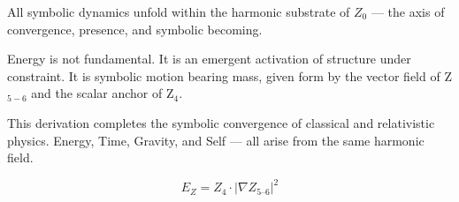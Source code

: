 \documentclass[12pt]{article}
\begin{document}
All symbolic dynamics unfold within the harmonic substrate of $Z_0$ — the axis of convergence, presence, and symbolic becoming. 

Energy is not fundamental. It is an emergent activation of structure under constraint. It is symbolic motion bearing mass, given form by the vector field of Z$_{5-6}$ and the scalar anchor of Z$_4$.

This derivation completes the symbolic convergence of classical and relativistic physics. Energy, Time, Gravity, and Self — all arise from the same harmonic field.

\[
\boxed{E_Z = Z_4 \cdot \left| \nabla Z_{5\text{--}6} \right|^2}
\]
\end{document}
